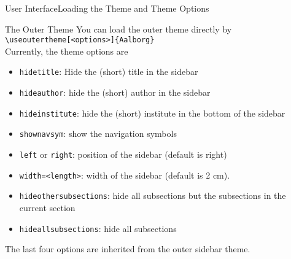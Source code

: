 \documentclass[10pt]{beamer}
\begin{document}
\begin{frame}{User Interface}{Loading the Theme and Theme Options}
  \begin{block}{The Outer Theme}
    You can load the outer theme directly by\\
    {\tt \textbackslash useoutertheme[<options>]\{Aalborg\}}\\
    Currently, the theme options are
  \begin{itemize}
    \item {\tt hidetitle}: Hide the (short) title in the sidebar
    \item {\tt hideauthor}: hide the (short) author in the sidebar
    \item {\tt hideinstitute}: hide the (short) institute in the bottom of the sidebar
    \item {\tt shownavsym}: show the navigation symbols
    \item {\tt left} or {\tt right}: position of the sidebar (default is right)
    \item {\tt width=<length>}: width of the sidebar (default is 2 cm).
    \item {\tt hideothersubsections}: hide all subsections but the subsections in the current section
    \item {\tt hideallsubsections}: hide all subsections
  \end{itemize}
  The last four options are inherited from the outer sidebar theme.
  \end{block}
\end{frame}
\end{document}

